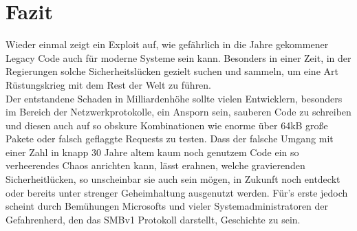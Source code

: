 \documentclass[DIV=12,headings=normal,pdftex,headinclude=false,footinclude=false,final]{scrreprt}
\begin{document}
\chapter{Fazit}
Wieder einmal zeigt ein Exploit auf, wie gefährlich in die Jahre gekommener Legacy Code auch für moderne Systeme sein kann. Besonders in einer Zeit, in der Regierungen solche Sicherheitslücken gezielt suchen und sammeln, um eine Art Rüstungskrieg mit dem Rest der Welt zu führen.\\
Der entstandene Schaden in Milliardenhöhe sollte vielen Entwicklern, besonders im Bereich der Netzwerkprotokolle, ein Ansporn sein, sauberen Code zu schreiben und diesen auch auf so obskure Kombinationen wie enorme über 64kB große Pakete oder falsch geflaggte Requests zu testen. Dass der falsche Umgang mit einer Zahl in knapp 30 Jahre altem kaum noch genutzem Code ein so verheerendes Chaos anrichten kann, lässt erahnen, welche gravierenden Sicherheitlücken, so unscheinbar sie auch sein mögen, in Zukunft noch entdeckt oder bereits unter strenger Geheimhaltung ausgenutzt werden. Für's erste jedoch scheint durch Bemühungen Microsofts und vieler Systemadministratoren der Gefahrenherd, den das SMBv1 Protokoll darstellt, Geschichte zu sein.

\clearpage
\label{sec:sources}
\renewcommand{\bibname}{Quellenverzeichnis}


\end{document}
